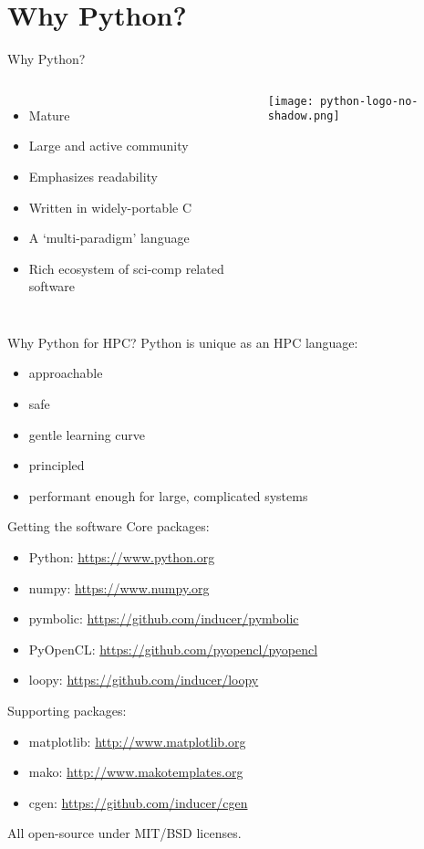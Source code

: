 \documentclass[english,compress]{beamer}
\begin{document}
\section{Why Python?}
\begin{frame}{Why Python?}
  \medskip

  \begin{columns}[c]
    \begin{itemize}
      \item Mature
      \item Large and active community
      \item Emphasizes readability
      \item Written in widely-portable C
      \item A `multi-paradigm' language
      \item Rich ecosystem of sci-comp related software
    \end{itemize}

    \texttt{[image: python-logo-no-shadow.png]}
  \end{columns}
\end{frame}
\begin{frame}{Why Python for HPC?}
  Python is unique as an HPC language:
  \begin{itemize}
  \item approachable
  \item safe
  \item gentle learning curve
  \item principled
  \item performant enough for large, complicated systems
  \end{itemize}
\end{frame}
\begin{frame}{Getting the software}
  Core packages:
  \begin{itemize}
    \item Python: \url{https://www.python.org}
    \item numpy: \url{https://www.numpy.org}
    \item pymbolic: \url{https://github.com/inducer/pymbolic}
    \item PyOpenCL: \url{https://github.com/pyopencl/pyopencl}
    \item loopy: \url{https://github.com/inducer/loopy}
  \end{itemize}
  Supporting packages:
  \begin{itemize}
    \item matplotlib: \url{http://www.matplotlib.org}
    \item mako: \url{http://www.makotemplates.org}
    \item cgen: \url{https://github.com/inducer/cgen}
  \end{itemize}
  All open-source under MIT/BSD licenses.
\end{frame}
\end{document}
